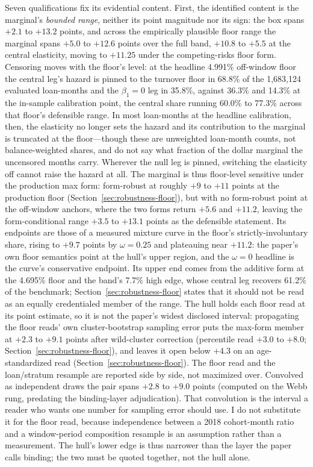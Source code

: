 \documentclass[12pt]{article}
\begin{document}
Seven qualifications fix its evidential content. First, the identified content is the marginal's \emph{bounded range}, neither its point magnitude nor its sign: the box spans $+2.1$ to $+13.2$ points, and across the empirically plausible floor range the marginal spans $+5.0$ to $+12.6$ points over the full band, $+10.8$ to $+5.5$ at the central elasticity, moving to $+11.25$ under the competing-risks floor form. Censoring moves with the floor's level: at the headline 4.991\% off-window floor the central leg's hazard is pinned to the turnover floor in 68.8\% of the 1,683,124 evaluated loan-months and the $\beta_1 = 0$ leg in 35.8\%, against 36.3\% and 14.3\% at the in-sample calibration point, the central share running 60.0\% to 77.3\% across that floor's defensible range. In most loan-months at the headline calibration, then, the elasticity no longer sets the hazard and its contribution to the marginal is truncated at the floor---though these are unweighted loan-month counts, not balance-weighted shares, and do not say what fraction of the dollar marginal the uncensored months carry. Wherever the null leg is pinned, switching the elasticity off cannot raise the hazard at all. The marginal is thus floor-level sensitive under the production max form: form-robust at roughly $+9$ to $+11$ points at the production floor (Section~\ref{sec:robustness-floor}), but with no form-robust point at the off-window anchors, where the two forms return $+5.6$ and $+11.2$, leaving the form-conditional range $+3.5$ to $+13.1$ points as the defensible statement. Its endpoints are those of a measured mixture curve in the floor's strictly-involuntary share, rising to $+9.7$ points by $\omega = 0.25$ and plateauing near $+11.2$: the paper's own floor semantics point at the hull's upper region, and the $\omega = 0$ headline is the curve's conservative endpoint. Its upper end comes from the additive form at the 4.695\% floor and the band's 7.7\% high edge, whose central leg recovers 61.2\% of the benchmark; Section~\ref{sec:robustness-floor} states that it should not be read as an equally credentialed member of the range. The hull holds each floor read at its point estimate, so it is not the paper's widest disclosed interval: propagating the floor reads' own cluster-bootstrap sampling error puts the max-form member at $+2.3$ to $+9.1$ points after wild-cluster correction (percentile read $+3.0$ to $+8.0$; Section~\ref{sec:robustness-floor}), and leaves it open below $+4.3$ on an age-standardized read (Section~\ref{sec:robustness-floor}). The floor read and the loan/stratum resample are reported side by side, not maximized over. Convolved as independent draws the pair spans $+2.8$ to $+9.0$ points (computed on the Webb rung, predating the binding-layer adjudication). That convolution is the interval a reader who wants one number for sampling error should use. I do not substitute it for the floor read, because independence between a 2018 cohort-month ratio and a window-period composition resample is an assumption rather than a measurement. The hull's lower edge is thus narrower than the layer the paper calls binding; the two must be quoted together, not the hull alone.
\end{document}
